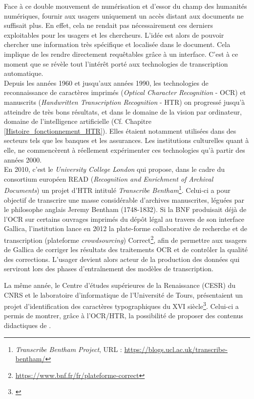 Face à ce double mouvement de numérisation et d'essor du champ des humanités numériques, fournir aux usagers uniquement un accès distant aux documents ne suffisait plus. En effet, cela ne rendait pas nécessairement ces derniers exploitables pour les usagers et les chercheurs. L'idée est alors de pouvoir chercher une information très spécifique et localisée dans le document. Cela implique de les rendre directement requêtables grâce à un interface. C'est à ce moment que se révèle tout l'intérêt porté aux technologies de transcription automatique.\\ 

Depuis les années 1960 et jusqu'aux années 1990, les technologies de reconnaissance de caractères imprimés (\textit{Optical Character Recognition} - OCR) et manuscrits (\textit{Handwritten Transcription Recognition} - HTR) on progressé jusqu'à atteindre de très bons résultats, et dans le domaine de la vision par ordinateur, domaine de l'intelligence artificielle (Cf. Chapitre \ref{Histoire_fonctionnement_HTR}). Elles étaient notamment utilisées dans des secteurs tels que les banques et les assurances. Les institutions culturelles quant à elle, ne commencèrent à réellement expérimenter ces technologies qu'à partir des années 2000. \\

En 2010, c'est le \textit{University College London} qui propose, dans le cadre du consortium européen READ (\textit{Recognition and Enrichment of Archival Documents}) un projet d'HTR intitulé \textit{Transcribe Bentham}\footnote{\textit{Transcribe Bentham Project}, URL : \url{https://blogs.ucl.ac.uk/transcribe-bentham/}}. Celui-ci a pour objectif de transcrire une masse considérable d'archives manuscrites, léguées par le philosophe anglais Jeremy Bentham (1748-1832). Si la BNF produisait déjà de l'OCR sur certains ouvrages imprimés du dépôt légal au travers de son interface Gallica, l'institution lance en 2012 la plate-forme collaborative de recherche et de transcription (plateforme \textit{crowdsourcing}) Correct\footnote{\url{https://www.bnf.fr/fr/plateforme-correct}}, afin de permettre aux usagers de Gallica de corriger les résultats des traitements OCR et de contrôler la qualité des corrections. L'usager devient alors acteur de la production des données qui serviront lors des phases d'entraînement des modèles de transcription.

La même année, le Centre d'études supérieures de la Renaissance (CESR) du CNRS et le laboratoire d'informatique de l'Université de Tours, présentaient un projet d'identification des caractères typographiques du XVI siècle\footnote{\cite{rayar_exploiting_2012}}. Celui-ci a permis de montrer, grâce à l'OCR/HTR, la possibilité de proposer des contenus didactiques de . 

